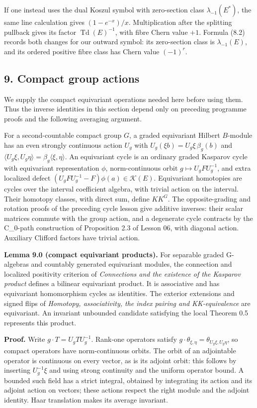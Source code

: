 \documentclass[
  11pt,
]{article}
\begin{document}
If one instead uses the dual Koszul symbol with zero-section class
\(\lambda_{-1}(E^*)\), the same line calculation gives \((1-e^{-x})/x\).
Multiplication after the splitting pullback gives its factor
\(\operatorname{Td}(E)^{-1}\), with fibre Chern value \(+1\). Formula
(8.2) records both changes for our outward symbol: its zero-section
class is \(\lambda_{-1}(E)\), and its ordered positive fibre class has
Chern value \((-1)^r\).

\subsection{9. Compact group actions}\label{compact-group-actions}

We supply the compact equivariant operations needed here before using
them. Thus the inverse identities in this section depend only on
preceding programme proofs and the following averaging argument.

For a second-countable compact group \(G\), a graded equivariant Hilbert
\(B\)-module has an even strongly continuous action \(U_g\) with
\(U_g(\xi b)=U_g\xi\,\beta_g(b)\) and
\(\langle U_g\xi,U_g\eta\rangle=\beta_g\langle\xi,\eta\rangle\). An
equivariant cycle is an ordinary graded Kasparov cycle with equivariant
representation \(\phi\), norm-continuous orbit
\(g\mapsto U_gFU_g^{-1}\), and extra localized defect
\((U_gFU_g^{-1}-F)\phi(a)\in\mathcal K(E)\). Equivariant homotopies are
cycles over the interval coefficient algebra, with trivial action on the
interval. Their homotopy classes, with direct sum, define \(KK^G\). The
opposite-grading and rotation proofs of the preceding cycle lesson give
additive inverses: their scalar matrices commute with the group action,
and a degenerate cycle contracts by the C\_0-path construction of
Proposition 2.3 of Lesson 06, with diagonal action. Auxiliary Clifford
factors have trivial action.

\textbf{Lemma 9.0 (compact equivariant products).} For separable graded
G-algebras and countably generated equivariant modules, the connection
and localized positivity criterion of \emph{Connections and the
existence of the Kasparov product} defines a bilinear equivariant
product. It is associative and has equivariant homomorphism cycles as
identities. The exterior extensions and signed flips of \emph{Homotopy,
associativity, the index pairing and KK-equivalence} are equivariant. An
invariant unbounded candidate satisfying the local Theorem 0.5
represents this product.

\textbf{Proof.} Write \(g\cdot T=U_gTU_g^{-1}\). Rank-one operators
satisfy \(g\cdot\theta_{\xi,\eta}=\theta_{U_g\xi,U_g\eta}\), so compact
operators have norm-continuous orbits. The orbit of an adjointable
operator is continuous on every vector, as is its adjoint orbit: this
follows by inserting \(U_g^{-1}\xi\) and using strong continuity and the
uniform operator bound. A bounded such field has a strict integral,
obtained by integrating its action and its adjoint action on vectors;
these actions respect the right module and the adjoint identity. Haar
translation makes its average invariant.
\end{document}
